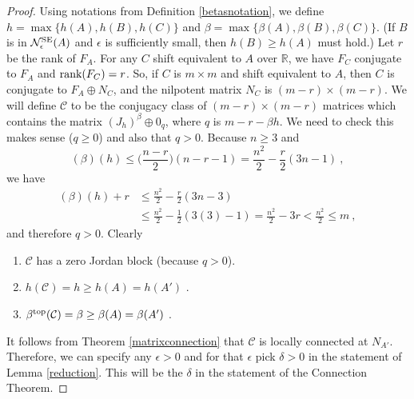 \documentclass{amsart}
\theoremstyle{definition}
\theoremstyle{remark}
\numberwithin{equation}{section}
\begin{document}
{{\begin{proof}
Using notations from Definition \ref{betasnotation}, 
we define  
 $h=\max\{h(A),h(B),h(C)\}$ and 
$\beta=\max\{\beta(A),\beta(B),\beta(C)\}$. 
(If  $B$ is in 
$\mathcal N_{\epsilon}^{\textnormal{SE}}(A)$ and $\epsilon $ 
is sufficiently small, then $h(B)\geq h(A)$ must 
hold.) 
Let $r$ be the rank of $F_A$. For 
any $C$ shift equivalent to $A$ over $\mathbb R$, 
we have $F_C$ conjugate to $F_A$ and 
$\textnormal{rank}(F_C)=r$. So, if $C$ is $m\times m$ 
and shift equivalent to $A$, then 
$C$ is conjugate to $F_A\oplus N_C$, and the 
nilpotent matrix $N_C$ is $(m-r)\times (m-r)$. We will 
define $\mathcal C$ to 
be the conjugacy class of $(m-r)\times (m-r)$
matrices which contains 
the matrix $(J_h)^{\beta}\oplus 0_q$, 
where $q$ is $ m - r-\beta h$. We need to check 
this makes sense ($q\geq 0$) and also that 
$q>0$. Because  $n\geq 3 $ and 
\[
(\beta )(h) \leq  
\Big(\frac{n-r}2\Big)(n-r-1)
= \frac{n^2}2 -\frac r2(3n-1) \ , 
\]
we have 
\begin{align*} 
(\beta )(h) +r 
&\leq 
\frac{n^2}2 -\frac r2(3n-3)\\
&\leq 
\frac{n^2}2 -\frac 12(3(3)-1) = 
\frac{n^2}2 -3r 
< \frac{n^2}2 \leq m \ ,
\end{align*} 
and therefore $ q > 0 $. 
Clearly 
\begin{enumerate} 
\item 
$\mathcal C$ has a zero Jordan block (because $q>0$). 
\item 
$h(\mathcal C) = h \geq h(A) = h(A')$ . 
\item 
$\beta^{\textnormal{top}}(\mathcal C)
= \beta \geq \beta (A) = \beta (A')$ . 
\end{enumerate} 
It follows from Theorem \ref{matrixconnection} 
that $\mathcal C$ is locally connected at 
$N_{A'}$. Therefore, we can specify any $\epsilon >0$ 
and for that $\epsilon $ pick $\delta > 0$ in the statement 
of Lemma \ref{reduction}. This will be the 
$\delta$ in the statement of the Connection Theorem. 


\end{proof}}}
\end{document}
